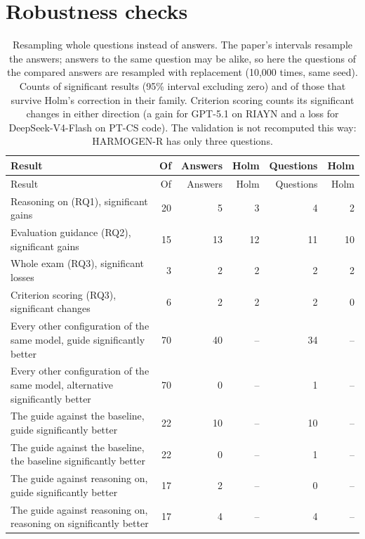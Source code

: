 \documentclass[10pt]{article}
\begin{document}
\section{Robustness checks}\label{sec:robustness}
\begingroup\footnotesize
\begin{longtable}{>{\raggedright\arraybackslash}p{6.4cm}rrrrr}
\caption{Resampling whole questions instead of answers. The paper's intervals resample the answers; answers to the same question may be alike, so here the questions of the compared answers are resampled with replacement (10,000 times, same seed). Counts of significant results (95\% interval excluding zero) and of those that survive Holm's correction in their family. Criterion scoring counts its significant changes in either direction (a gain for GPT-5.1 on RIAYN and a loss for DeepSeek-V4-Flash on PT-CS code). The validation is not recomputed this way: HARMOGEN-R has only three questions.}\\
\hline
Result & Of & Answers & Holm & Questions & Holm \\ \hline
\endfirsthead
\hline
Result & Of & Answers & Holm & Questions & Holm \\ \hline
\endhead
Reasoning on (RQ1), significant gains & 20 & 5 & 3 & 4 & 2 \\
Evaluation guidance (RQ2), significant gains & 15 & 13 & 12 & 11 & 10 \\
Whole exam (RQ3), significant losses & 3 & 2 & 2 & 2 & 2 \\
Criterion scoring (RQ3), significant changes & 6 & 2 & 2 & 2 & 0 \\
Every other configuration of the same model, guide significantly better & 70 & 40 & -- & 34 & -- \\
Every other configuration of the same model, alternative significantly better & 70 & 0 & -- & 1 & -- \\
The guide against the baseline, guide significantly better & 22 & 10 & -- & 10 & -- \\
The guide against the baseline, the baseline significantly better & 22 & 0 & -- & 1 & -- \\
The guide against reasoning on, guide significantly better & 17 & 2 & -- & 0 & -- \\
The guide against reasoning on, reasoning on significantly better & 17 & 4 & -- & 4 & -- \\
\hline
\end{longtable}
\endgroup
\end{document}
